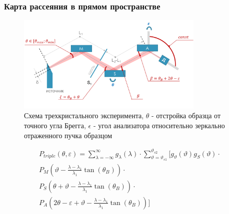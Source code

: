 
\subsubsection{Карта рассеяния в прямом пространстве}

\begin{figure}[H]
  \centering
  \includegraphics[width=0.8\textwidth]{images/triple_crystal_schem.png}
  \caption{Схема трехкристального эксперимента, $\theta$ - отстройка образца от точного угла Брегга,
  $\epsilon$ - угол анализатора относительно зеркально отраженного пучка образцом}
  \label{ris:}
\end{figure}

\begin{eqnarray} \label{eq:doudle_spectra_angle_map}
  P_{triple}(\theta,\varepsilon) = \sum_{\lambda = -\infty}^{\infty}g_{\lambda}(\lambda)\cdot
  \sum_{\vartheta = \vartheta_{s1}}^{\vartheta_{s2}} \Bigg[ g_{\vartheta}(\vartheta) g_{S}(\vartheta) \cdot \nonumber \\
    P_M \left(\vartheta - \frac{\lambda - \lambda_1}{\lambda_1}\tan(\theta_B) \right) \cdot \nonumber \\
   P_S \left(\theta + \vartheta - \frac{\lambda - \lambda_1}{\lambda_1}\tan(\theta_B)\right)  \cdot  \nonumber \\
   P_A \left(2\theta - \varepsilon + \vartheta - \frac{\lambda - \lambda_1}{\lambda_1}\tan(\theta_B)\right) \Bigg]
 \end{eqnarray}
